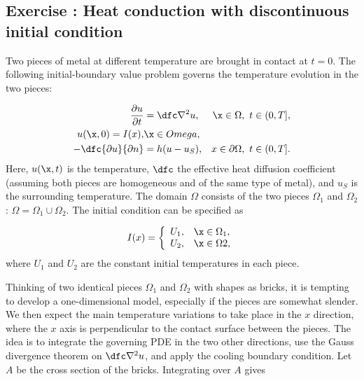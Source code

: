 \documentclass[graybox,envcountchap,sectrefs,final]{svmonodo}
\newenvironment{doconceexercise}{}{}
\newcounter{doconceexercisecounter}
\begin{document}
\begin{doconceexercise}

\subsection*{Exercise \thedoconceexercisecounter: Heat conduction with discontinuous initial condition}

\label{scale:exer:twometal}

Two pieces of metal at different temperature are brought in contact
at $t=0$. The following initial-boundary value problem governs the
temperature evolution in the two pieces:

\begin{align}
\frac{\partial u}{\partial t} &= \dfc\nabla^2 u,\ & \x\in\Omega,\ t\in (0,T],\\ 
u(\x,0)=I(x), & \x\in Omega,\\ 
-\dfc{\partial u}{\partial n} &= h(u-u_S), & x\in\partial\Omega,\ t\in (0,T].
\end{align}
Here, $u(\x,t)$ is the temperature, $\dfc$ the effective heat diffusion
coefficient (assuming both pieces are homogeneous and of the same type of
metal), and $u_S$ is the surrounding temperature.
The domain $\Omega$ consists of the two pieces $\Omega_1$ and $\Omega_2$:
$\Omega = \Omega_1\cup\Omega_2$. The initial condition can be specified as

\[ I(x) = \left\lbrace\begin{array}{ll}
U_1, & \x\in\Omega_1,\\ 
U_2, & \x\in\Omega 2,
\end{array}\right.
\]
where $U_1$ and $U_2$ are the constant initial temperatures in each piece.

Thinking of two identical pieces $\Omega_1$ and $\Omega_2$ with shapes
as bricks, it is tempting to develop a one-dimensional model, especially
if the pieces are somewhat slender. We then expect the main temperature
variations to take place in the $x$ direction, where the $x$ axis is
perpendicular to the contact surface between the pieces. The idea is
to integrate the governing PDE in the two other directions, use the
Gauss divergence theorem on
$\dfc\nabla^2u$, and apply the cooling boundary condition. Let $A$ be
the cross section of the bricks. Integrating over $A$ gives


\end{doconceexercise}
\end{document}
